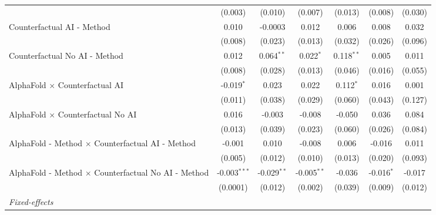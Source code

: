 \begin{tabular}{lcccccc}
                                                              & (0.003)        & (0.010)       & (0.007)       & (0.013)      & (0.008)      & (0.030)\\   
   Counterfactual AI - Method                                 & 0.010          & -0.0003       & 0.012         & 0.006        & 0.008        & 0.032\\   
                                                              & (0.008)        & (0.023)       & (0.013)       & (0.032)      & (0.026)      & (0.096)\\   
   Counterfactual No AI - Method                              & 0.012          & 0.064$^{**}$  & 0.022$^{*}$   & 0.118$^{**}$ & 0.005        & 0.011\\   
                                                              & (0.008)        & (0.028)       & (0.013)       & (0.046)      & (0.016)      & (0.055)\\   
   AlphaFold $\times$ Counterfactual AI                       & -0.019$^{*}$   & 0.023         & 0.022         & 0.112$^{*}$  & 0.016        & 0.001\\   
                                                              & (0.011)        & (0.038)       & (0.029)       & (0.060)      & (0.043)      & (0.127)\\   
   AlphaFold $\times$ Counterfactual No AI                    & 0.016          & -0.003        & -0.008        & -0.050       & 0.036        & 0.084\\   
                                                              & (0.013)        & (0.039)       & (0.023)       & (0.060)      & (0.026)      & (0.084)\\   
   AlphaFold - Method $\times$ Counterfactual AI - Method     & -0.001         & 0.010         & -0.008        & 0.006        & -0.016       & 0.011\\   
                                                              & (0.005)        & (0.012)       & (0.010)       & (0.013)      & (0.020)      & (0.093)\\   
   AlphaFold - Method $\times$ Counterfactual No AI - Method  & -0.003$^{***}$ & -0.029$^{**}$ & -0.005$^{**}$ & -0.036       & -0.016$^{*}$ & -0.017\\   
                                                              & (0.0001)       & (0.012)       & (0.002)       & (0.039)      & (0.009)      & (0.012)\\   
   \midrule
   \emph{Fixed-effects}\\

\end{tabular}
